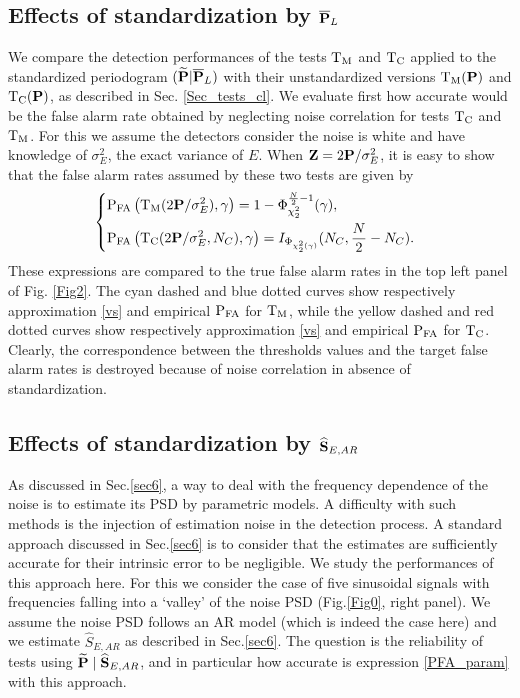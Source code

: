 \documentclass[journal]{IEEEtran}
\begin{document}
\subsection{Effects of standardization by $\overline{\bf P}_L$}
 \label{secC}
We compare the detection performances of the tests ${\rm T_M}$ and ${\rm T_C}$ { applied to} the standardized periodogram $(\widetilde{\bf P}|\overline{\bf P}_L)$ with their unstandardized versions ${\rm T_M}(\bf P)$ and ${\rm T_{C}}(\bf P)$, as described in Sec. \ref{Sec_tests_cl}.
We evaluate first how accurate would be the false alarm rate obtained by neglecting noise correlation for tests ${\rm T_C}$ and ${\rm T_M}$.
For this we assume the detectors consider the noise is white and have knowledge of $\sigma^2_E$, the exact variance of $E$. When ${\bf{Z}}=2 {\bf{P}}/\sigma^2_E$, it is easy to show  that the  false alarm rates assumed by these two tests are  given by 
\begin{equation}
	\!\!\!\!
	\left\{
	\begin{aligned}
		&{\rm P_{FA}}\left({\rm T_M}(2 {\bf{P}}/\sigma^2_E),\gamma\right)=1- \Phi_{\chi^2_2}^{\frac{N}{2}-1}(\gamma),\\
		&{\rm P_{FA}}\left({\rm T_C}(2 {\bf{P}}/\sigma^2_E, N_C),\gamma\right)= I_{\Phi_{\chi^2_2(\gamma)}} (N_C, \frac{N}{2}-N_C).
	\end{aligned}
	\right.
	\label{vs}
\end{equation}
These expressions are compared to the true false alarm rates  in the top left panel of Fig. \ref{Fig2}.
The cyan { dashed} and blue  { dotted} curves show respectively approximation  \eqref{vs} and empirical $\rm P_{FA}$ for ${\rm T_M}$,
 while the yellow  { dashed} and red  { dotted} curves show respectively approximation  \eqref{vs} and empirical $\rm P_{FA}$ for ${\rm T_C}$.
 Clearly, the correspondence between the thresholds values and the target false alarm rates
is destroyed because of noise correlation in absence of standardization. 
 
\subsection{Effects of standardization by $\widehat{\bf S}_{E,AR}$}
 \label{SecD}
As discussed in Sec.\ref{sec6}, a way to deal with the frequency dependence of the noise is to estimate its PSD by parametric models. 
A difficulty with such methods is the injection of estimation noise in the { detection}  process. A standard approach discussed in Sec.\ref{sec6} is to consider that the estimates are sufficiently accurate for their {intrinsic error} to be negligible. We study the performances of this approach here.
For this we consider the  case of  five sinusoidal signals with frequencies falling into a `valley'  of the    noise PSD  { (Fig.\ref{Fig0}, right panel)}.
We assume the noise PSD follows an AR model (which is indeed the case here) and we  estimate $\widehat{S}_{E,AR}$ as described in Sec.\ref{sec6}.
 The question is the reliability of tests using  ${\bf \widetilde{\bf P}}\;|\;\widehat{\bf S}_{E,AR}$, and in particular how accurate is expression \eqref{PFA_param}
  { with this approach}.
  
\end{document}
